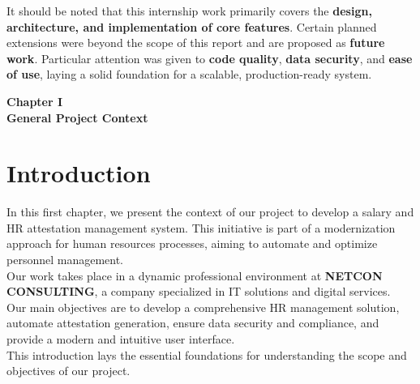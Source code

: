 \documentclass[a4paper,12pt]{report}
\begin{document}
\begin{doublespace}
It should be noted that this internship work primarily covers the \textbf{design, architecture, and implementation of core features}. Certain planned extensions were beyond the scope of this report and are proposed as \textbf{future work}. Particular attention was given to \textbf{code quality}, \textbf{data security}, and \textbf{ease of use}, laying a solid foundation for a scalable, production-ready system.\\
\end{doublespace}


\cleardoublepage
\renewcommand{\headrulewidth}{1pt}
\fancyhead[R]{\hspace*{4cm}}

\setcounter{chapter}{1}
\begin{doublespace}
{}
\vspace*{10cm}
\centering
\textbf{ \huge Chapter I \\ [1 cm] General Project Context}
\end{doublespace} 
\cleardoublepage 
\begin{doublespace}

\end{doublespace}

\fancyhead[R]{\nouppercase{\rightmark}}
\section*{Introduction}
\begin{doublespace}

\hspace{1cm}In this first chapter, we present the context of our project to develop a salary and HR attestation management system. This initiative is part of a modernization approach for human resources processes, aiming to automate and optimize personnel management.\\
\hspace{1cm}Our work takes place in a dynamic professional environment at \textbf{NETCON CONSULTING}, a company specialized in IT solutions and digital services.\\
\hspace{1cm}Our main objectives are to develop a comprehensive HR management solution, automate attestation generation, ensure data security and compliance, and provide a modern and intuitive user interface.\\
\hspace{1cm}This introduction lays the essential foundations for understanding the scope and objectives of our project.
\end{doublespace}
\end{document}
